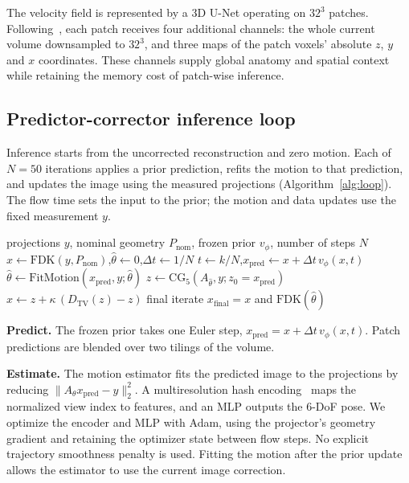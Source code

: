 \documentclass[11pt]{article}
\newcommand{\FDK}{\mathrm{FDK}}
\newcommand{\thetahat}{\hat\theta}
\newcommand{\Pnom}{P_{\mathrm{nom}}}
\begin{document}
The velocity field is represented by a 3D U-Net operating on $32^3$ patches.
Following~\cite{yang25}, each patch receives four additional channels: the whole
current volume downsampled to $32^3$, and three maps of the patch voxels' absolute
$z$, $y$ and $x$ coordinates. These channels supply global anatomy and spatial context
while retaining the memory cost of patch-wise inference.

\subsection{Predictor-corrector inference loop}
\label{sec:loop}

Inference starts from the uncorrected reconstruction and zero motion. Each of $N=50$
iterations applies a prior prediction, refits the motion to that prediction, and updates
the image using the measured projections (Algorithm~\ref{alg:loop}). The flow time
sets the input to the prior; the motion and data updates use the fixed measurement $y$.

\begin{algorithm}[H]
\caption{Blind rigid-motion correction with the geometry-bridge prior}
\label{alg:loop}
\begin{algorithmic}[1]
\Require projections $y$, nominal geometry $\Pnom$, frozen prior $v_\phi$, number of steps $N$
\State $x\gets\FDK(y,\Pnom)$,\quad $\thetahat\gets0$,\quad $\Delta t\gets1/N$
  \State $t\gets k/N$,\quad $x_{\mathrm{pred}}\gets x+\Delta t\,v_\phi(x,t)$
  \State $\thetahat\gets\mathrm{FitMotion}(x_{\mathrm{pred}},y;\thetahat)$ 
  \State $z\gets\mathrm{CG}_5(A_{\thetahat},y;z_0=x_{\mathrm{pred}})$ 
  \State $x\gets z+\kappa\,(D_{\mathrm{TV}}(z)-z)$ 
\EndFor
\State \Return final iterate $x_{\mathrm{final}}=x$ and $\FDK(\thetahat)$
\end{algorithmic}
\end{algorithm}

\textbf{Predict.} The frozen prior takes one Euler step,
$x_{\mathrm{pred}}=x+\Delta t\,v_\phi(x,t)$. Patch predictions are blended over two
tilings of the volume.

\textbf{Estimate.} The motion estimator fits the predicted image to the projections
by reducing $\|A_\theta x_{\mathrm{pred}}-y\|_2^2$. A multiresolution hash
encoding~\cite{mueller22} maps the normalized view index to features, and an MLP
outputs the 6-DoF pose. We optimize the encoder and MLP with Adam, using the
projector's geometry gradient and retaining the optimizer state between flow steps.
No explicit trajectory smoothness penalty is used. Fitting the motion after the prior
update allows the estimator to use the current image correction.
\end{document}
